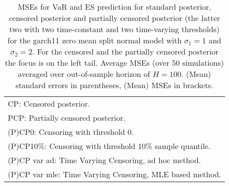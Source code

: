 {\begin{sidewaystable}
\begin{tabular}{cc cc cccc cccc}
\multicolumn{12}{l}{\footnotesize{CP: Censored posterior.}}  \\ 
\multicolumn{12}{l}{\footnotesize{PCP: Partially censored posterior.}} \\ 
\multicolumn{12}{l}{\footnotesize{(P)CP0: Censoring with threshold 0.}} \\ 
\multicolumn{12}{l}{\footnotesize{(P)CP10\%: Censoring with threshold 10\% sample quantile.}}  \\ 
\multicolumn{12}{l}{\footnotesize{(P)CP var ad: Time Varying Censoring, ad hoc method.}} \\ 
\multicolumn{12}{l}{\footnotesize{(P)CP var mle: Time Varying Censoring, MLE based method.}}  \\ 
\end{tabular}
 \caption{MSEs for VaR and ES prediction for standard posterior, censored posterior and partially censored posterior (the latter two with two time-constant and two time-varying thresholds) for the garch11 zero mean split normal model with $\sigma_{1} = 1$ and $\sigma_{2} = 2$. For the censored and the partially censored posterior the focus is on the left tail. Average MSEs (over 50 simulations) averaged over out-of-sample horizon of $H=100$. (Mean) standard errors in parentheses, (Mean) MSEs in brackets.} 
\label{tab:garch11_pcp_var}  
\end{sidewaystable}
}